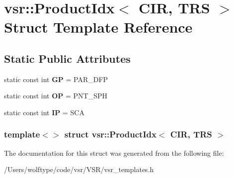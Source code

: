 \hypertarget{structvsr_1_1_product_idx_3_01_c_i_r_00_01_t_r_s_01_4}{\section{vsr\-:\-:Product\-Idx$<$ C\-I\-R, T\-R\-S $>$ Struct Template Reference}
\label{structvsr_1_1_product_idx_3_01_c_i_r_00_01_t_r_s_01_4}
}
\subsection*{Static Public Attributes}
\begin{DoxyCompactItemize}
\item 
\hypertarget{structvsr_1_1_product_idx_3_01_c_i_r_00_01_t_r_s_01_4_a073ca23c877d18cdf5ffd6d827d4dac2}{static const int {\bfseries G\-P} = P\-A\-R\-\_\-\-D\-F\-P}\label{structvsr_1_1_product_idx_3_01_c_i_r_00_01_t_r_s_01_4_a073ca23c877d18cdf5ffd6d827d4dac2}

\item 
\hypertarget{structvsr_1_1_product_idx_3_01_c_i_r_00_01_t_r_s_01_4_aea098b1dfd33be719b7bd485176d9ce1}{static const int {\bfseries O\-P} = P\-N\-T\-\_\-\-S\-P\-H}\label{structvsr_1_1_product_idx_3_01_c_i_r_00_01_t_r_s_01_4_aea098b1dfd33be719b7bd485176d9ce1}

\item 
\hypertarget{structvsr_1_1_product_idx_3_01_c_i_r_00_01_t_r_s_01_4_ac38ae3a1d23b1083aeea345ed00d06c5}{static const int {\bfseries I\-P} = S\-C\-A}\label{structvsr_1_1_product_idx_3_01_c_i_r_00_01_t_r_s_01_4_ac38ae3a1d23b1083aeea345ed00d06c5}

\end{DoxyCompactItemize}
\subsubsection*{template$<$$>$ struct vsr\-::\-Product\-Idx$<$ C\-I\-R, T\-R\-S $>$}



The documentation for this struct was generated from the following file\-:\begin{DoxyCompactItemize}
\item 
/\-Users/wolftype/code/vsr/\-V\-S\-R/vsr\-\_\-templates.\-h\end{DoxyCompactItemize}
